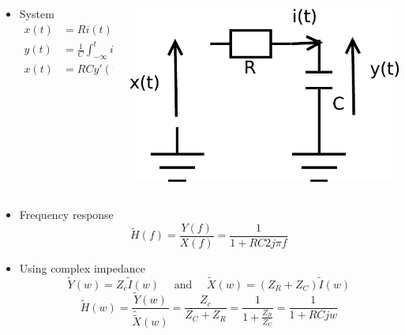 \begin{columns}
    \begin{column}%
   \begin{itemize}
  \item System
\begin{align*}
x(t)&=Ri(t)+y(t)\\
y(t)&=\frac{1}{C}\int_{-\infty}^ti(v)dv \\
x(t)&=RCy'(t)+y(t)
\end{align*}
  \end{itemize}       
    \end{column}
    \begin{column}%
      \begin{center}
\includegraphics[width=.4\columnwidth]{imgs/fourier/RC2}
\end{center}
    \end{column}
  \end{columns}
  \begin{itemize}
  \item Frequency response\pause
$$ \tilde H(f)=\frac{Y(f)}{X(f)}={\frac{1}{1+RC2j\pi f}}$$
\item Using complex impedance\pause
\begin{equation*}
    \tilde Y(w)=Z_c \tilde I(w) \quad \text{ and } \quad \tilde X(w)= {(Z_R+Z_C) \tilde I(w)}
\end{equation*}
\begin{equation*}
    \tilde H(w)=\frac{ \tilde Y(w)}{\tilde \tilde X(w)}={\frac{Z_c}{Z_C+Z_R}=\frac{1}{1+\frac{Z_R}{Z_C}}=\frac{1}{1+RCjw}}
\end{equation*}
  \end{itemize}

